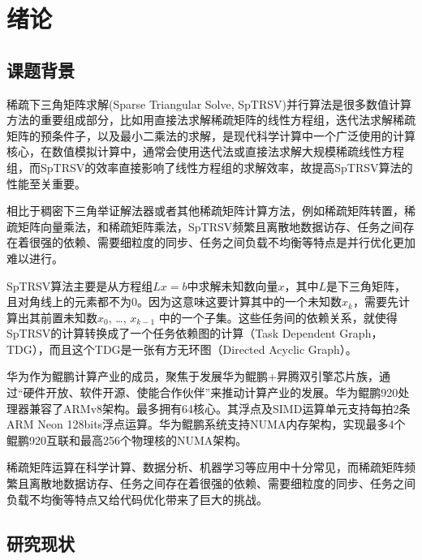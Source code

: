 \chapter{绪论}
\section{课题背景}

稀疏下三角矩阵求解(Sparse Triangular Solve, SpTRSV)并行算法是很多数值计算方法的重要组成部分，比如用直接法求解稀疏矩阵的线性方程组\cite{davis2006direct}，迭代法求解稀疏矩阵的预条件子\cite{elman1982iterative}，以及最小二乘法的求解\cite{saad2003iterative}，是现代科学计算中一个广泛使用的计算核心，在数值模拟计算中，通常会使用迭代法或直接法求解大规模稀疏线性方程组，而SpTRSV的效率直接影响了线性方程组的求解效率，故提高SpTRSV算法的性能至关重要。

相比于稠密下三角举证解法器\cite{hogg2013fast}或者其他稀疏矩阵计算方法，例如稀疏矩阵转置\cite{wang2016parallel}，稀疏矩阵向量乘法\cite{liu2015csr5}\cite{liu2015speculative}，和稀疏矩阵乘法\cite{liu2015framework}，SpTRSV频繁且离散地数据访存、任务之间存在着很强的依赖、需要细粒度的同步、任务之间负载不均衡等特点是并行优化更加难以进行。

SpTRSV算法主要是从方程组$Lx=b$中求解未知数向量$ x $，其中$ L $是下三角矩阵，且对角线上的元素都不为0。因为这意味这要计算其中的一个未知数$x_k$，需要先计算出其前置未知数$x_0$, \dots, $x_{k-1}$ 中的一个子集。这些任务间的依赖关系，就使得SpTRSV的计算转换成了一个任务依赖图的计算（Task Dependent Graph，TDG），而且这个TDG是一张有方无环图（Directed Acyclic Graph）。

华为作为鲲鹏计算产业的成员，聚焦于发展华为鲲鹏+昇腾双引擎芯片族，通过“硬件开放、软件开源、使能合作伙伴”来推动计算产业的发展。华为鲲鹏920处理器兼容了ARMv8架构。最多拥有64核心。其浮点及SIMD运算单元支持每拍2条ARM Neon 128bits浮点运算。华为鲲鹏系统支持NUMA内存架构，实现最多4个鲲鹏920互联和最高256个物理核的NUMA架构。 

稀疏矩阵运算在科学计算、数据分析、机器学习等应用中十分常见，而稀疏矩阵频繁且离散地数据访存、任务之间存在着很强的依赖、需要细粒度的同步、任务之间负载不均衡等特点又给代码优化带来了巨大的挑战。


\section{研究现状}

